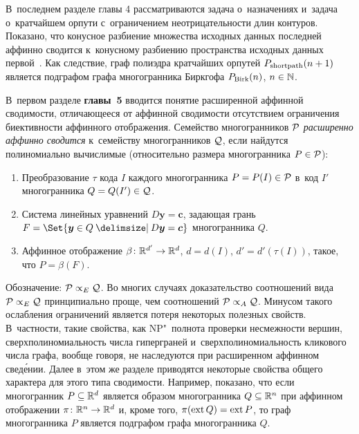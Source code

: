 В~последнем разделе главы 4 рассматриваются задача о~назначениях и~задача о~кратчайшем орпути с~ограничением неотрицательности длин контуров. Показано, что конусное разбиение множества исходных данных последней аффинно сводится к~конусному разбиению пространства исходных данных первой~.
Как следствие, граф полиэдра кратчайших орпутей $P_{\textup{shortpath}}(n+1)$ является подграфом графа многогранника Биркгофа $P_{\textup{Birk}}(n)$, $n \in \mathbb{N}$.



В~первом разделе \textbf{главы~5} вводится понятие расширенной аффинной сводимости, отличающееся от аффинной сводимости отсутствием ограничения биективности аффинного отображения. 
Семейство многогранников ${\mathcal P}$ \emph{расширенно аффинно сводится} к~семейству многогранников ${\mathcal Q}$, если найдутся полиномиально вычислимые (относительно размера многогранника $P\in {\mathcal P}$):
\begin{enumerate}
\item 
Преобразование $\tau$ кода $I$ каждого многогранника $P = P(I)\in {\mathcal P}$ в~код $I'$ многогранника $Q = Q(I') \in {\mathcal Q}$.
\item 
Система линейных уравнений $D\bm{y}=\bm{c}$, задающая грань
\(F = \Set{\bm{y}\in Q \given D\bm{y}=\bm{c}}\)
многогранника $Q$.
\item 
Аффинное отображение \(\beta\colon \mathbb{R}^{d'} \to \mathbb{R}^{d}\), $d = d(I)$, $d' = d'(\tau(I))$, такое, что $P = \beta(F)$.
\end{enumerate}
Обозначение: ${\mathcal P} \propto_E {\mathcal Q}$.  
Во многих случаях доказательство соотношений вида ${\mathcal P} \propto_E {\mathcal Q}$ принципиально проще, чем соотношений ${\mathcal P} \propto_A {\mathcal Q}$.
Минусом такого ослабления ограничений является потеря некоторых полезных свойств.
В~частности, такие свойства, как NP"~полнота проверки несмежности вершин, сверхполиномиальность числа гиперграней и~сверхполиномиальность кликового числа графа, вообще говоря, не наследуются при расширенном аффинном свед\'{е}нии.
Далее в~этом же разделе приводятся некоторые свойства общего характера для этого типа сводимости. Например, показано, что если многогранник $P \subseteq \mathbb{R}^d$ является образом многогранника $Q \subseteq \mathbb{R}^n$ при аффинном отображении $\pi \colon \mathbb{R}^n \to \mathbb{R}^d$ и, кроме того, $\pi(\operatorname{ext} Q) = \operatorname{ext} P$, то граф многогранника $P$ является подграфом графа многогранника $Q$.

